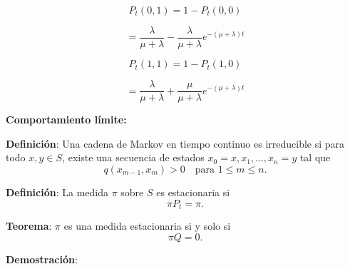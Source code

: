 \documentclass[12pt,a4paper]{article}
\newcommand{\definicion}[1]{%
\begin{definicionbox}
\textbf{Definición}: #1
\end{definicionbox}
}
\newcommand{\teorema}[1]{%
\begin{teoremabox}
\textbf{Teorema}: #1
\end{teoremabox}
}
\begin{document}
\begin{equation*}
P_t(0,1) = 1 - P_t(0,0)
\end{equation*}

\begin{equation*}
= \frac{\lambda}{\mu+\lambda} - \frac{\lambda}{\mu+\lambda} e^{-(\mu+\lambda)t}
\end{equation*}

\begin{equation*}
P_t(1,1) = 1 - P_t(1,0)
\end{equation*}

\begin{equation*}
= \frac{\lambda}{\mu+\lambda} + \frac{\mu}{\mu+\lambda} e^{-(\mu+\lambda)t}
\end{equation*}


\textbf{Comportamiento límite:}

\definicion{Una cadena de Markov en tiempo continuo es irreducible si para todo $x, y \in S$, existe una secuencia de estados $x_0 = x, x_1, \ldots, x_n = y$ tal que
\begin{equation*}
q(x_{m-1}, x_m) > 0 \quad \text{para } 1 \leq m \leq n.
\end{equation*}}

\begin{center}
\end{center}

\definicion{La medida $\pi$ sobre $S$ es estacionaria si
\begin{equation*}
\pi P_t = \pi.
\end{equation*}
}


\teorema{$\pi$ es una medida estacionaria si y solo si
\begin{equation*}
\pi Q = 0.
\end{equation*}
}

\textbf{Demostración}:
\end{document}

